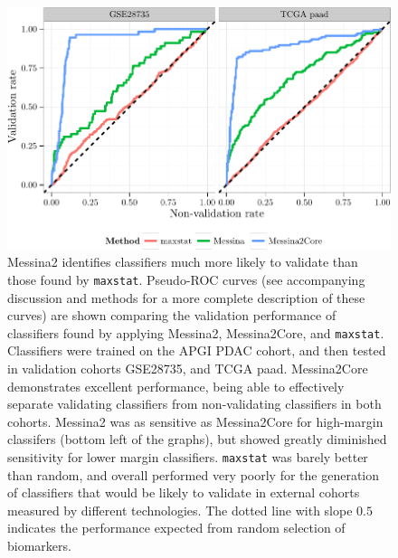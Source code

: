 \documentclass[dissertation.tex]{subfiles}
\begin{document}
\begin{figure}[!htbp]
\centering
\includegraphics[width=\linewidth]{analysis/messina/figure/07-E3-E3-val-detcurves-plots-1}
\caption[Validation performance of Messina2 versus \texorpdfstring{\texttt{maxstat}}{maxstat}]{Messina2 identifies classifiers much more likely to validate than those found by \texttt{maxstat}.  Pseudo-ROC curves (see accompanying discussion and methods for a more complete description of these curves) are shown comparing the validation performance of classifiers found by applying Messina2, Messina2Core, and \texttt{maxstat}.  Classifiers were trained on the \gls{APGI} \gls{PDAC} cohort, and then tested in validation cohorts GSE28735, and \gls{TCGA} paad.  Messina2Core demonstrates excellent performance, being able to effectively separate validating classifiers from non-validating classifiers in both cohorts.  Messina2 was as sensitive as Messina2Core for high-margin classifers (bottom left of the graphs), but showed greatly diminished sensitivity for lower margin classifiers.  \texttt{maxstat} was barely better than random, and overall performed very poorly for the generation of classifiers that would be likely to validate in external cohorts measured by different technologies.  The dotted line with slope $0.5$ indicates the performance expected from random selection of biomarkers.}
\label{fig:mess-val-detrel}
\end{figure}
\end{document}
